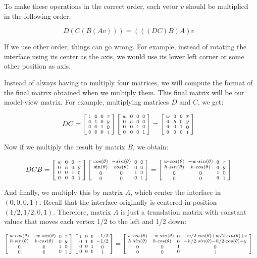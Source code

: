 To make these operations in the correct order, each vetor $v$ should
be multiplied in the following order:

$$
D(C(B(A v))) = (((DC)B)A)v
$$

If we use other order, things can go wrong. For example, instead of
rotating the interface using its center as the axis, we would use
its lower left corner or some other position as axis.

Instead of always having to multiply four matrices, we will compute
the format of the final matrix obtained when we multiply them. This
final matrix will be our model-view matrix. For example, multiplying
matrices $D$ and $C$, we get:

$$ DC=\left[{{1 \atop 0}\atop {0\atop 0}}{{0 \atop 1}\atop {0 \atop
      0}}{{0\atop 0}\atop{1 \atop 0}}{{x \atop y}\atop{0\atop
      1}}\right]\left[{{w
      \atop 0}\atop {0\atop 0}}{{0 \atop h}\atop {0 \atop 0}}{{0\atop
      0}\atop{1 \atop 0}}{{0 \atop 0}\atop{0\atop 1}}\right]=
\left[{{w \atop 0}\atop {0\atop 0}}
  {{0 \atop h}\atop {0 \atop 0}}
  {{0\atop 0}\atop{1 \atop 0}}
  {{x \atop y}\atop{0\atop 1}}\right]
$$

Now if we multiply the result by matrix $B$, we obtain:

$$ DCB = \left[{{w \atop 0}\atop {0\atop 0}} {{0 \atop h}\atop
  {0 \atop 0}} {{0\atop 0}\atop{1 \atop 0}} {{x \atop y}\atop{0\atop
  1}}\right]\left[{{cos(\theta) \atop \sin(\theta)}\atop {0\atop
  0}}{{-sin(\theta) \atop cos(\theta)}\atop {0 \atop 0}}{{0\atop
  0}\atop{1 \atop 0}}{{0 \atop 0}\atop{0\atop 1}}\right]=
\left[{{w\cdot cos(\theta) \atop h\cdot sin(\theta)}\atop {0\atop 0}}
  {{-w\cdot sin(\theta) \atop h\cdot cos(\theta)}\atop {0 \atop 0}}
  {{0\atop 0}\atop{1 \atop 0}}
  {{x \atop y}\atop{0\atop 1}}\right]
$$


And finally, we multiply this by matrix $A$, which center the
interface in $(0, 0, 0, 1)$. Recall that the interface originally is
centered in position $(1/2, 1/2, 0, 1)$. Therefore, matrix $A$ is just
a translation matrix with constant values that moves each vertex 1/2
to the left and 1/2 down:

$$
\left[{{w\cdot cos(\theta) \atop h\cdot sin(\theta)}\atop {0\atop 0}}
  {{-w\cdot sin(\theta) \atop h\cdot cos(\theta)}\atop {0 \atop 0}}
  {{0\atop 0}\atop{1 \atop 0}}
  {{x \atop y}\atop{0\atop 1}}\right]
\left[{{1 \atop 0}\atop {0\atop 0}}{{0 \atop 1}\atop {0 \atop
      0}}{{0\atop 0}\atop{1 \atop 0}}{{-1/2 \atop -1/2}\atop{0\atop
      1}}\right]=
\left[{{w\cdot cos(\theta) \atop h\cdot sin(\theta)}\atop {0\atop 0}}
  {{-w\cdot sin(\theta) \atop h\cdot cos(\theta)}\atop {0 \atop 0}}
  {{0\atop 0}\atop{1 \atop 0}} {{-w/2\cdot cos(\theta) + w/2\cdot
  sin(\theta)+x \atop -h/2\cdot sin(\theta)-h/2\cdot
  cos(\theta)+y}\atop{0\atop 1}}\right]
$$

